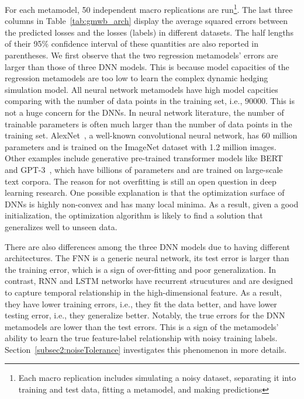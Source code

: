 For each metamodel, 50 independent macro replications are run\footnote{Each macro replication includes simulating a noisy dataset, separating it into training and test data, fitting a metamodel, and making predictions}.
The last three columns in Table~\ref{tab:gmwb_arch} display the average squared errors between the predicted losses and the losses (labels) in different datasets.
The half lengths of their 95\% confidence interval of these quantities are also reported in parentheses.
We first observe that the two regression metamodels' errors are larger than those of three DNN models.
This is because model capacities of the regression metamodels are too low to learn the complex dynamic hedging simulation model.
All neural network metamodels have high model capcities comparing with the number of data points in the training set, i.e., $\num{90000}$.
This is not a huge concern for the DNNs.
In neural network literature, the number of trainable parameters is often much larger than the number of data points in the training set.
AlexNet~\citep{krizhevsky2012imagenet}, a well-known convolutional neural network, has 60 million parameters and is trained on the ImageNet dataset with 1.2 million images.
Other examples include generative pre-trained transformer models like BERT~\citep{devlin2018bert} and GPT-3~\citep{brown2020language}, which have billions of parameters and are trained on large-scale text corpora.
The reason for not overfitting is still an open question in deep learning research.
One possible explanation is that the optimization surface of DNNs is highly non-convex and has many local minima.
As a result, given a good initialization, the optimization algorithm is likely to find a solution that generalizes well to unseen data.

There are also differences among the three DNN models due to having different architectures.
The FNN is a generic neural network, its test error is larger than the training error, which is a sign of over-fitting and poor generalization.
In contrast, RNN and LSTM networks have recurrent strucutures and are designed to capture temporal relationship in the high-dimensional feature.
As a result, they have lower training errors, i.e., they fit the data better, and have lower testing error, i.e., they generalize better.
Notably, the true errors for the DNN metamodels are lower than the test errors.
This is a sign of the metamodels' ability to learn the true feature-label relationship with noisy training labels. 
Section~\ref{subsec2:noiseTolerance} investigates this phenomenon in more details.

